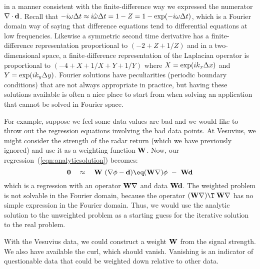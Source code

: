 in a manner consistent with the finite-difference way we expressed the numerator 
$\nabla \cdot {\bf d}$. Recall that $- i\omega \Delta t \approx i
\hat{\omega} \Delta t = 1-Z = 1-{\rm exp}(-i \omega \Delta t)$, 
which is a Fourier 
domain way of saying that difference equations tend to differential equations at low 
frequencies. Likewise a symmetric second time derivative has a finite-difference 
representation proportional to $(-2+Z+1/Z)$ and in a two-dimensional space, a 
finite-difference representation of the Laplacian operator is proportional to $(-4+X+1/X+Y+1/Y)$ where $X = {\rm exp}(i k_x \Delta x )$ and $Y = {\rm exp}(i k_y \Delta y )$. 
Fourier solutions have peculiarities (periodic boundary conditions) 
that are not always appropriate in practice, but having these solutions available 
is often a nice place to start from when solving an application that cannot be solved 
in Fourier space.

\par
For example, suppose we feel some data values are bad and we
would like to throw out the regression equations involving the bad data points. At 
Vesuvius, we might consider the strength of the radar return (which we have
previously ignored) and use it as a weighting function ${\bf W}$.
Now, our regression~(\ref{eqn:analyticsolution}) becomes:
\begin{equation}
{\bf 0} \quad \approx\quad
{\bf W} \ (\nabla \phi -{\bf d})
\eq ({\bf W} \nabla) \phi \ -\  {\bf Wd}
\end{equation}
which is a regression with an operator ${\bf W \nabla}$  and 
data ${\bf Wd}$. The weighted problem is not solvable in the Fourier domain, because 
the operator $({\bf W} \nabla )\T\; {\bf W} \nabla$ has no simple
expression in the Fourier domain. 
Thus, 
we would use the analytic solution to the unweighted problem as a starting guess for 
the iterative solution to the real problem. 
\par
With the Vesuvius data, we could construct a weight ${\bf W}$ from the signal strength.
We also have available the curl, which should vanish.
Vanishing is an indicator of questionable data
that could be weighted down relative to other data.


